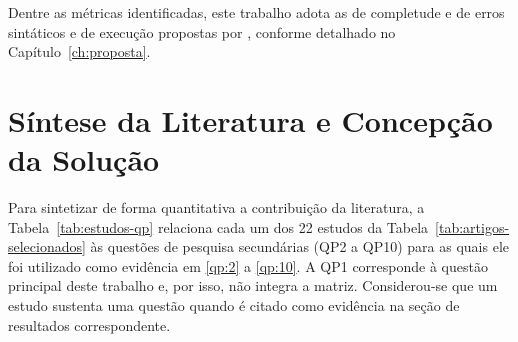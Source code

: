 Dentre as métricas identificadas, este trabalho adota as de completude e de erros sintáticos e de execução propostas por , conforme detalhado no Capítulo~\ref{ch:proposta}.

\section{Síntese da Literatura e Concepção da Solução}
\label{sec:sintese-literatura}

Para sintetizar de forma quantitativa a contribuição da literatura, a Tabela~\ref{tab:estudos-qp} relaciona cada um dos 22 estudos da Tabela~\ref{tab:artigos-selecionados} às questões de pesquisa secundárias (QP2 a QP10) para as quais ele foi utilizado como evidência em \ref{qp:2} a \ref{qp:10}. A QP1 corresponde à questão principal deste trabalho e, por isso, não integra a matriz. Considerou-se que um estudo sustenta uma questão quando é citado como evidência na seção de resultados correspondente.

